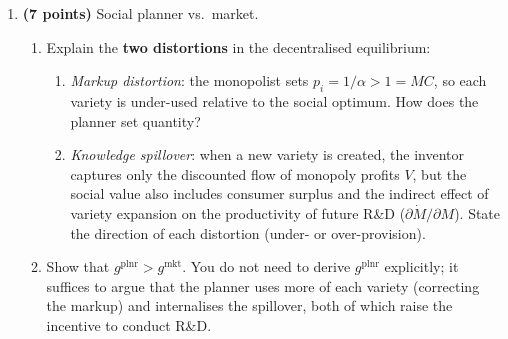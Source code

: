 \documentclass[a4paper,11pt]{article}
\newcommand{\ctilde}{\tilde{c}}
\begin{document}
\begin{enumerate}[label=\textbf{\arabic*.}, leftmargin=*, itemsep=6pt]
\begin{enumerate}[label=(\alph*), itemsep=4pt]
        \item \textbf{R\&D free entry.}  A researcher can create a new variety by hiring
        labour at wage $w$.  The cost of discovering one new variety is $w/(\lambda M)$
        (the reciprocal of the marginal product of research labour).  Free entry drives
        profits from R\&D to zero:
        \[
            V = \frac{w}{\lambda M}.
        \]
        Combine with the no-arbitrage condition to show $r = \lambda M \pi / w$.

        \item \textbf{Labour market and Euler equation.}  The wage equals the marginal
        product of $L_Y$ in the final sector: $w = (1-\alpha)Y/L_Y$.  Use the resource
        allocations $L_Y + L_A = L$ and the Euler equation $\dot{\ctilde}/\ctilde =
        (r-\rho)/\sigma$ to derive the BGP growth rate:
        \[
            g^{\mathrm{mkt}} = \frac{\lambda(1-\alpha)L - \rho}{\sigma + 1}.
        \]
        Identify the \textbf{scale effect}: explain why $g^{\mathrm{mkt}}$ rises with total
        labour supply $L$.
    \end{enumerate}

    \begin{hintbox}
        On the BGP, $L_Y$ and $L_A$ are constant fractions of $L$.  Use the free-entry
        condition and wage expression to pin down $L_Y^*$, substitute into the Euler
        equation.
    \end{hintbox}

    \item \textbf{(7 points)} Social planner vs.\ market.

    \begin{enumerate}[label=(\alph*), itemsep=4pt]
        \item Explain the \textbf{two distortions} in the decentralised equilibrium:
        \begin{enumerate}[label=(\roman*), itemsep=2pt]
            \item \emph{Markup distortion}: the monopolist sets $p_i = 1/\alpha > 1 = MC$,
            so each variety is under-used relative to the social optimum.  How does the
            planner set quantity?
            \item \emph{Knowledge spillover}: when a new variety is created, the inventor
            captures only the discounted flow of monopoly profits $V$, but the social value
            also includes consumer surplus and the indirect effect of variety expansion on
            the productivity of future R\&D ($\partial \dot{M}/\partial M$).  State the
            direction of each distortion (under- or over-provision).
        \end{enumerate}
        \item Show that $g^{\mathrm{plnr}} > g^{\mathrm{mkt}}$.  You do not need to
        derive $g^{\mathrm{plnr}}$ explicitly; it suffices to argue that the planner uses
        more of each variety (correcting the markup) and internalises the spillover,
        both of which raise the incentive to conduct R\&D.


\end{enumerate}
\end{enumerate}
\end{document}
